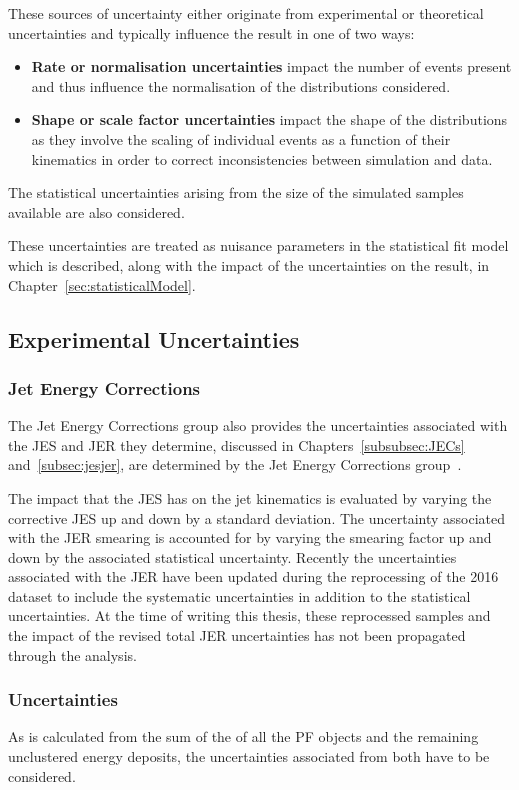 These sources of uncertainty either originate from experimental or theoretical uncertainties and typically influence the result in one of two ways:
\begin{itemize}
\item \textbf{Rate or normalisation uncertainties} impact the number of events present and thus influence the  normalisation of the distributions considered.
\item \textbf{Shape or scale factor uncertainties} impact the shape of the distributions as they involve the scaling of individual events as a function of their kinematics in order to correct inconsistencies between simulation and data.
\end{itemize}

The statistical uncertainties arising from the size of the simulated samples available are also considered.

These uncertainties are treated as nuisance parameters in the statistical fit model which is described, along with the impact of the uncertainties on the result, in Chapter~\ref{sec:statisticalModel}.

\subsection{Experimental Uncertainties}
\subsubsection{Jet Energy Corrections}
The Jet Energy Corrections group also provides the uncertainties associated with the JES and JER they determine, discussed in Chapters~\ref{subsubsec:JECs} and~\ref{subsec:jesjer}, are determined by the Jet Energy Corrections group~\cite{Khachatryan:2016kdb}. 

The impact that the JES has on the jet kinematics is evaluated by varying the corrective JES up and down by a standard deviation.
The uncertainty associated with the JER smearing is accounted for by varying the smearing factor up and down by the associated statistical uncertainty.
Recently the uncertainties associated with the JER have been updated during the reprocessing of the 2016 dataset to include the systematic uncertainties in addition to the statistical uncertainties.
At the time of writing this thesis, these reprocessed samples and the impact of the revised total JER uncertainties has not been propagated through the analysis.

\subsubsection{\MET Uncertainties}
As \MET is calculated from the sum of the \pT of all the PF objects and the remaining unclustered energy deposits, the uncertainties associated from both have to be considered.

